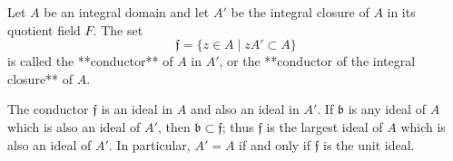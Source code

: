 Let $A$ be an integral domain and let $A'$ be the integral closure of $A$ in its quotient field $F$. The set
$$\mathfrak{f} = \{ z \in A \mid zA' \subset A \}$$
is called the **conductor** of $A$ in $A'$, or the **conductor of the integral closure** of $A$.

The conductor $\mathfrak{f}$ is an ideal in $A$ and also an ideal in $A'$. If $\mathfrak{b}$ is any ideal of $A$ which is also an ideal of $A'$, then $\mathfrak{b} \subset \mathfrak{f}$; thus $\mathfrak{f}$ is the largest ideal of $A$ which is also an ideal of $A'$. In particular, $A' = A$ if and only if $\mathfrak{f}$ is the unit ideal.
